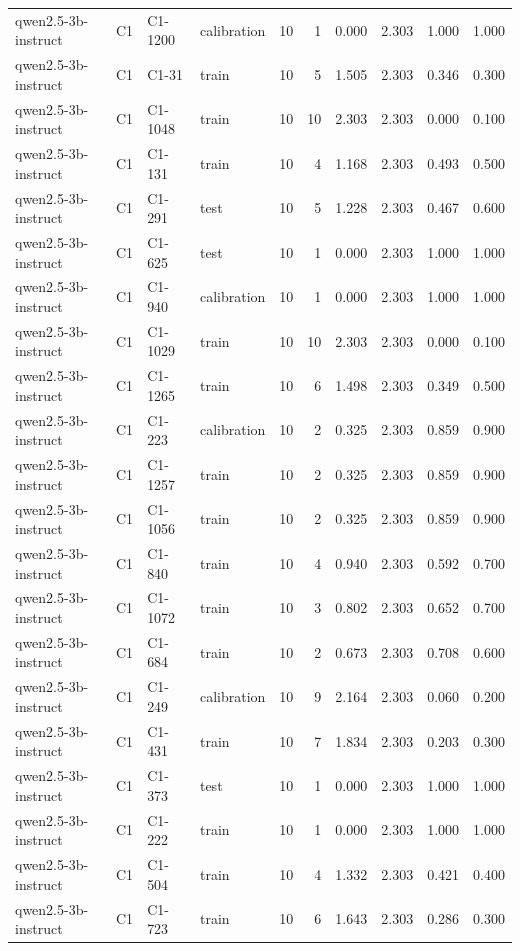 \begin{table}
\begin{tabular}{llllrrrrrr}
qwen2.5-3b-instruct & C1 & C1-1200 & calibration & 10 & 1 & 0.000 & 2.303 & 1.000 & 1.000 \\
qwen2.5-3b-instruct & C1 & C1-31 & train & 10 & 5 & 1.505 & 2.303 & 0.346 & 0.300 \\
qwen2.5-3b-instruct & C1 & C1-1048 & train & 10 & 10 & 2.303 & 2.303 & 0.000 & 0.100 \\
qwen2.5-3b-instruct & C1 & C1-131 & train & 10 & 4 & 1.168 & 2.303 & 0.493 & 0.500 \\
qwen2.5-3b-instruct & C1 & C1-291 & test & 10 & 5 & 1.228 & 2.303 & 0.467 & 0.600 \\
qwen2.5-3b-instruct & C1 & C1-625 & test & 10 & 1 & 0.000 & 2.303 & 1.000 & 1.000 \\
qwen2.5-3b-instruct & C1 & C1-940 & calibration & 10 & 1 & 0.000 & 2.303 & 1.000 & 1.000 \\
qwen2.5-3b-instruct & C1 & C1-1029 & train & 10 & 10 & 2.303 & 2.303 & 0.000 & 0.100 \\
qwen2.5-3b-instruct & C1 & C1-1265 & train & 10 & 6 & 1.498 & 2.303 & 0.349 & 0.500 \\
qwen2.5-3b-instruct & C1 & C1-223 & calibration & 10 & 2 & 0.325 & 2.303 & 0.859 & 0.900 \\
qwen2.5-3b-instruct & C1 & C1-1257 & train & 10 & 2 & 0.325 & 2.303 & 0.859 & 0.900 \\
qwen2.5-3b-instruct & C1 & C1-1056 & train & 10 & 2 & 0.325 & 2.303 & 0.859 & 0.900 \\
qwen2.5-3b-instruct & C1 & C1-840 & train & 10 & 4 & 0.940 & 2.303 & 0.592 & 0.700 \\
qwen2.5-3b-instruct & C1 & C1-1072 & train & 10 & 3 & 0.802 & 2.303 & 0.652 & 0.700 \\
qwen2.5-3b-instruct & C1 & C1-684 & train & 10 & 2 & 0.673 & 2.303 & 0.708 & 0.600 \\
qwen2.5-3b-instruct & C1 & C1-249 & calibration & 10 & 9 & 2.164 & 2.303 & 0.060 & 0.200 \\
qwen2.5-3b-instruct & C1 & C1-431 & train & 10 & 7 & 1.834 & 2.303 & 0.203 & 0.300 \\
qwen2.5-3b-instruct & C1 & C1-373 & test & 10 & 1 & 0.000 & 2.303 & 1.000 & 1.000 \\
qwen2.5-3b-instruct & C1 & C1-222 & train & 10 & 1 & 0.000 & 2.303 & 1.000 & 1.000 \\
qwen2.5-3b-instruct & C1 & C1-504 & train & 10 & 4 & 1.332 & 2.303 & 0.421 & 0.400 \\
qwen2.5-3b-instruct & C1 & C1-723 & train & 10 & 6 & 1.643 & 2.303 & 0.286 & 0.300 \\

\end{tabular}
\end{table}
